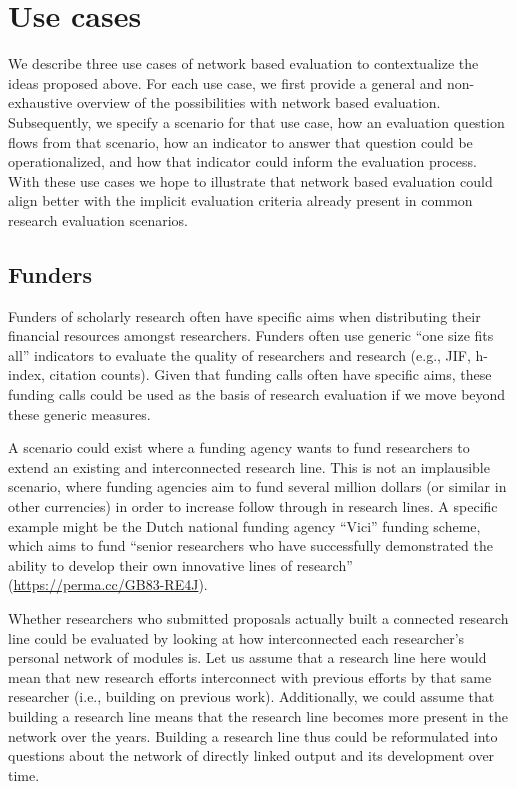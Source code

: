 \documentclass[a5paper]{book}
\begin{document}
\section{Use cases}\label{use-cases}

We describe three use cases of network based evaluation to contextualize
the ideas proposed above. For each use case, we first provide a general
and non-exhaustive overview of the possibilities with network based
evaluation. Subsequently, we specify a scenario for that use case, how
an evaluation question flows from that scenario, how an indicator to
answer that question could be operationalized, and how that indicator
could inform the evaluation process. With these use cases we hope to
illustrate that network based evaluation could align better with the
implicit evaluation criteria already present in common research
evaluation scenarios.

\subsection{Funders}\label{funders}

Funders of scholarly research often have specific aims when distributing
their financial resources amongst researchers. Funders often use generic
\enquote{one size fits all} indicators to evaluate the quality of
researchers and research (e.g., JIF, h-index, citation counts). Given
that funding calls often have specific aims, these funding calls could
be used as the basis of research evaluation if we move beyond these
generic measures.

A scenario could exist where a funding agency wants to fund researchers
to extend an existing and interconnected research line. This is not an
implausible scenario, where funding agencies aim to fund several million
dollars (or similar in other currencies) in order to increase follow
through in research lines. A specific example might be the Dutch
national funding agency \enquote{Vici} funding scheme, which aims to
fund \enquote{senior researchers who have successfully demonstrated the
ability to develop their own innovative lines of research}
(\url{https://perma.cc/GB83-RE4J}).

Whether researchers who submitted proposals actually built a connected
research line could be evaluated by looking at how interconnected each
researcher's personal network of modules is. Let us assume that a
research line here would mean that new research efforts interconnect
with previous efforts by that same researcher (i.e., building on
previous work). Additionally, we could assume that building a research
line means that the research line becomes more present in the network
over the years. Building a research line thus could be reformulated into
questions about the network of directly linked output and its
development over time.
\end{document}
